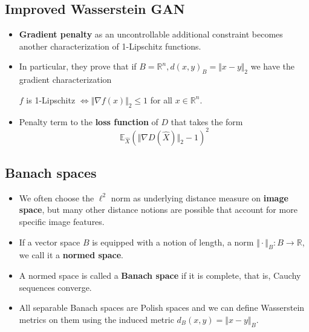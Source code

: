 \documentclass[landscape,headrule,footrule]{foils}
\begin{document}
\subsection{Improved Wasserstein GAN}
\tableofcontents
\begin{frame}
\begin{flushleft}
\begin{itemize}
\item \textbf{Gradient penalty} as an uncontrollable additional constraint becomes another characterization of 1-Lipschitz functions.
\\
\item In particular, they prove that if $B=\mathbb{R}^n, d(x,y)_B=\Vert x-y \Vert_2$ we have the gradient characterization
\begin{center}
	$f$ is 1-Lipschitz $\Longleftrightarrow \Vert \nabla f(x) \Vert_2 \leq 1$ for all $x\in \mathbb{R}^n$. \\
\end{center}	
\item Penalty term to the \textbf{loss function} of $D$ that takes the form
\begin{equation}
\mathbb{E}_{\widehat{X}} \left( \Vert \nabla D(\widehat{X}) \Vert_2 -1 \right)^2
\end{equation}
\end{itemize}
\end{flushleft}
\end{frame}

\subsection{Banach spaces}
\tableofcontents
\begin{frame}
\begin{flushleft}
\begin{itemize}
\item We often choose the $\ell^2$ norm as underlying distance measure on \textbf{image space}, but many other distance notions are possible that account for more specific image features.
\\
\item If a vector space $B$ is equipped with a notion of length, a norm $\Vert \cdot \Vert_B :B\rightarrow \mathbb{R}$, we call it a \textbf{normed space}.
\\
\item A normed space is called a \textbf{Banach space} if it is complete, that is, Cauchy sequences converge.
\\
\item All separable Banach spaces are Polish spaces and we can define Wasserstein metrics on them using the induced metric $d_B (x,y)= \Vert x-y \Vert_B$.
\end{itemize}
\end{flushleft}
\end{frame}
\end{document}
